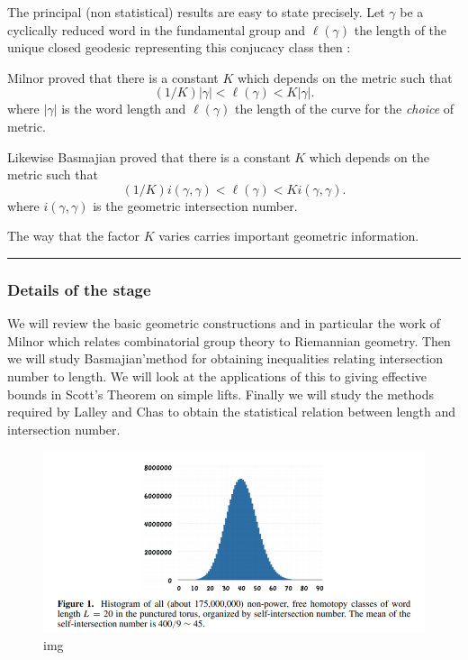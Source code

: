 \documentclass[
]{article}
\begin{document}
The principal (non statistical) results are easy to state precisely. Let
\(\gamma\) be a cyclically reduced word in the fundamental group and
\(\ell(\gamma)\) the length of the unique closed geodesic representing
this conjucacy class then :

Milnor proved that there is a constant \(K\) which depends on the metric
such that \[(1/K) |\gamma| < \ell(\gamma) < K|\gamma|. \] where
\(|\gamma|\) is the word length and \(\ell(\gamma)\) the length of the
curve for the \emph{choice} of metric.

Likewise Basmajian proved that there is a constant \(K\) which depends
on the metric such that
\[(1/K) i(\gamma,\gamma) < \ell(\gamma) < K i(\gamma,\gamma). \] where
\(i(\gamma,\gamma)\) is the geometric intersection number.

The way that the factor \(K\) varies carries important geometric
information.

\begin{center}\rule{0.5\linewidth}{0.5pt}\end{center}

\hypertarget{details-of-the-stage}{%
\subsubsection{Details of the stage}\label{details-of-the-stage}}

We will review the basic geometric constructions and in particular the
work of Milnor which relates combinatorial group theory to Riemannian
geometry. Then we will study Basmajian'method for obtaining inequalities
relating intersection number to length. We will look at the applications
of this to giving effective bounds in Scott's Theorem on simple lifts.
Finally we will study the methods required by Lalley and Chas to obtain
the statistical relation between length and intersection number.

\begin{figure}
\centering
\includegraphics{./chas.png}
\caption{img}
\end{figure}
\end{document}
